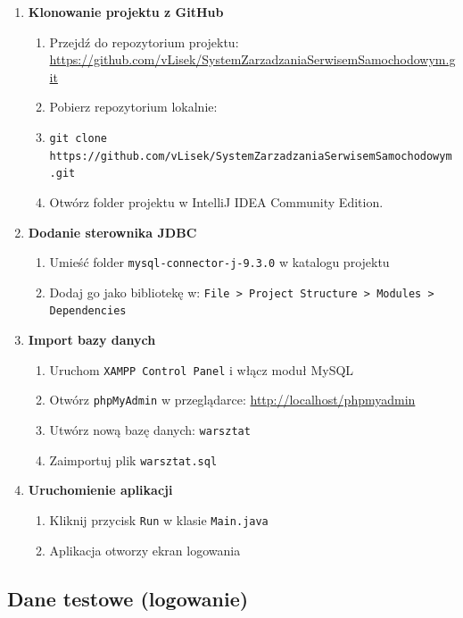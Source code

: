 \begin{enumerate}
  \item \textbf{Klonowanie projektu z GitHub}
  \begin{enumerate}
    \item Przejdź do repozytorium projektu:\\ \url{https://github.com/vLisek/SystemZarzadzaniaSerwisemSamochodowym.git}
    \item Pobierz repozytorium lokalnie:
    \item {\small\texttt{git clone https://github.com/vLisek/SystemZarzadzaniaSerwisemSamochodowym.git}}
    \item Otwórz folder projektu w IntelliJ IDEA Community Edition.
  \end{enumerate}

  \item \textbf{Dodanie sterownika JDBC}
  \begin{enumerate}
    \item Umieść folder \texttt{mysql-connector-j-9.3.0} w katalogu projektu
    \item Dodaj go jako bibliotekę w: \texttt{File > Project Structure > Modules > Dependencies}
  \end{enumerate}

  \item \textbf{Import bazy danych}
  \begin{enumerate}
    \item Uruchom \texttt{XAMPP Control Panel} i włącz moduł MySQL
    \item Otwórz \texttt{phpMyAdmin} w przeglądarce: \url{http://localhost/phpmyadmin}
    \item Utwórz nową bazę danych: \texttt{warsztat}
    \item Zaimportuj plik \texttt{warsztat.sql}
  \end{enumerate}

  \item \textbf{Uruchomienie aplikacji}
  \begin{enumerate}
    \item Kliknij przycisk \texttt{Run} w klasie \texttt{Main.java}
    \item Aplikacja otworzy ekran logowania
  \end{enumerate}
\end{enumerate}

\newpage
\subsection{Dane testowe (logowanie)}

